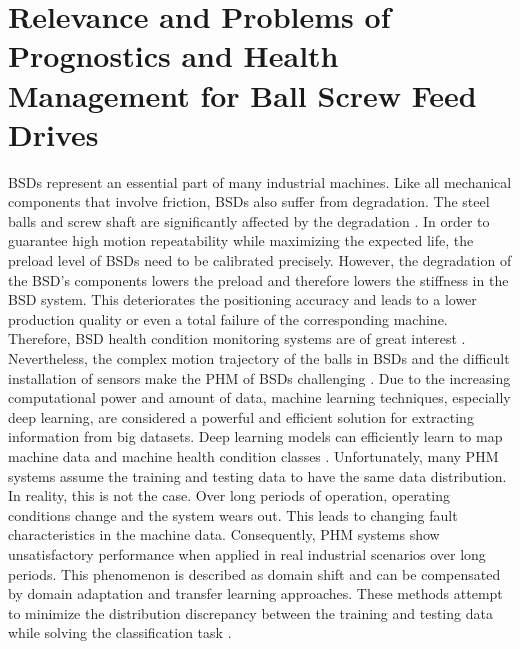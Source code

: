 \section{Relevance and Problems of Prognostics and Health Management for Ball Screw Feed Drives}
BSDs represent an essential part of many industrial machines. Like all mechanical components that involve friction, BSDs also suffer from degradation. The steel balls and screw shaft are significantly affected by the degradation \cite{Pandhare2021}. In order to guarantee high motion repeatability while maximizing the expected life, the preload level of BSDs need to be calibrated precisely. However, the degradation of the BSD's components lowers the preload and therefore lowers the stiffness in the BSD system. This deteriorates the positioning accuracy and leads to a lower production quality or even a total failure of the corresponding machine. Therefore, BSD health condition monitoring systems are of great interest \cite{Pandhare2021}. Nevertheless, the complex motion trajectory of the balls in BSDs and the difficult installation of sensors make the PHM of BSDs challenging \cite{LiPin2018}. Due to the increasing computational power and amount of data, machine learning techniques, especially deep learning, are considered a powerful and efficient solution for extracting information from big datasets. Deep learning models can efficiently learn to map machine data and machine health condition classes \cite{ZHAO2019213}. Unfortunately, many PHM systems assume the training and testing data to have the same data distribution. In reality, this is not the case. Over long periods of operation, operating conditions change and the system wears out. This leads to changing fault characteristics in the machine data. Consequently, PHM systems show unsatisfactory performance when applied in real industrial scenarios over long periods. This phenomenon is described as domain shift and can be compensated by domain adaptation and transfer learning approaches. These methods attempt to minimize the distribution discrepancy between the training and testing data while solving the classification task \cite{AZAMFAR2020103932}.


